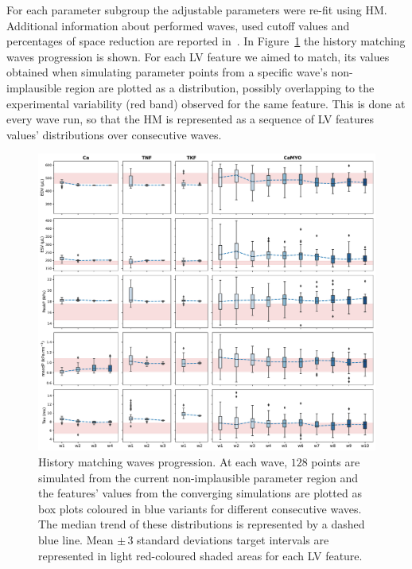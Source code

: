 \vspace{0.2cm}
For each parameter subgroup the adjustable parameters were re-fit using HM. Additional information about performed waves, used cutoff values and percentages of space reduction are reported in~. In Figure~\ref{fig:lvfeatsmatch} the history matching waves progression is shown. For each LV feature we aimed to match, its values obtained when simulating parameter points from a specific wave's non-implausible region are plotted as a distribution, possibly overlapping to the experimental variability (red band) observed for the same feature. This is done at every wave run, so that the HM is represented as a sequence of LV features values' distributions over consecutive waves.

\begin{figure}[!ht]
    \myfloatalign
    \includegraphics[width=\textwidth]{figures/chapter07/Fig_6.pdf}
    \caption{History matching waves progression. At each wave, $128$ points are simulated from the current non-implausible parameter region and the features' values from the converging simulations are plotted as box plots coloured in blue variants for different consecutive waves. The median trend of these distributions is represented by a dashed blue line. Mean $\pm\,3$ standard deviations target intervals are represented in light red-coloured shaded areas for each LV feature.}
    \label{fig:lvfeatsmatch}
\end{figure}

